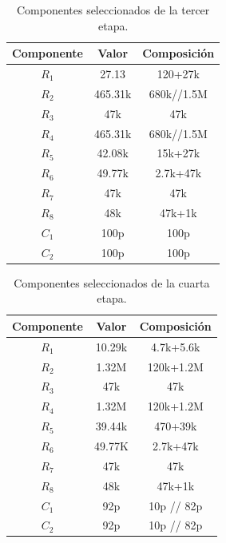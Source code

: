 \begin{table}[H]
\centering
\begin{tabular}{ccc}
\hline
\multicolumn{1}{c}{Componente} & \multicolumn{1}{c}{Valor} & Composición \\ \hline
$R_1$                           & 27.13                      & 120+27k     \\
$R_2$                           & 465.31k                    & 680k//1.5M  \\
$R_3$                           & 47k                        & 47k         \\
$R_4$                           & 465.31k                    & 680k//1.5M  \\
$R_5$                           & 42.08k                     & 15k+27k     \\
$R_6$                           & 49.77k                     & 2.7k+47k    \\
$R_7$                           & 47k                        & 47k         \\
$R_8$                           & 48k                        & 47k+1k         \\
$C_1$                           & 100p                       & 100p        \\
$C_2$                           & 100p                       & 100p        \\
\hline
\end{tabular}
\caption{Componentes seleccionados de la tercer etapa.}
\end{table}

\begin{table}[H]
\centering
\begin{tabular}{ccc}
\hline
\multicolumn{1}{c}{Componente} & \multicolumn{1}{c}{Valor} & Composición \\ \hline
$R_1$                           & 10.29k                     & 4.7k+5.6k   \\
$R_2$                           & 1.32M                      & 120k+1.2M   \\
$R_3$                           & 47k                        & 47k         \\
$R_4$                           & 1.32M                      & 120k+1.2M   \\
$R_5$                           & 39.44k                     & 470+39k     \\
$R_6$                           & 49.77K                     & 2.7k+47k    \\
$R_7$                           & 47k                        & 47k         \\
$R_8$                           & 48k                        & 47k+1k         \\
$C_1$                           & 92p                        & 10p // 82p  \\
$C_2$                           & 92p                        & 10p // 82p  \\
\hline
\end{tabular}
\caption{Componentes seleccionados de la cuarta etapa.}
\end{table}

